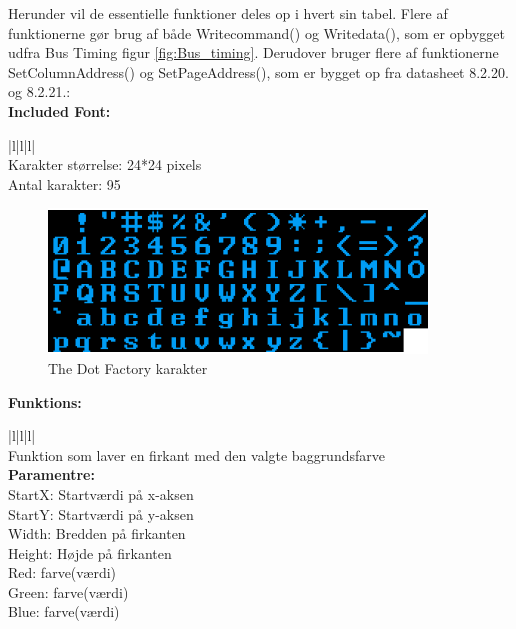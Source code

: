 Herunder vil de essentielle funktioner deles op i hvert sin tabel. Flere af funktionerne gør brug af både Writecommand() og Writedata(), som er opbygget udfra Bus Timing figur \ref{fig:Bus_timing}. Derudover bruger flere af funktionerne SetColumnAddress() og SetPageAddress(), som er bygget op fra datasheet 8.2.20. og 8.2.21.: \\

\newpage
\textbf{\Large Included Font:}

\begin{center}
\begin{tabular}{ |l|l|l| }
\hline
{} \\
\hline
Karakter størrelse: 24*24 pixels  \\
Antal karakter: 95\\
\hline

\end{tabular}
\end{center} 
\begin{figure}[H]
	\centering
	\includegraphics[width = 150 pt]{Img/Thedotfactory.png}
	\caption{The Dot Factory karakter}
	\label{fig:Thedotfactory}
\end{figure}

\textbf{\Large Funktions:}

\begin{center}
\begin{tabular}{ |l|l|l| }
\hline
{} \\
\hline
Funktion som laver en firkant med den valgte baggrundsfarve  \\
\hline
\textbf{Paramentre:}  \\ StartX: Startværdi på x-aksen \\StartY: Startværdi på y-aksen\\ Width: Bredden på firkanten\\ Height: Højde på firkanten\\ Red: farve(værdi)\\ Green: farve(værdi) \\ Blue: farve(værdi)\\
\hline
\end{tabular}
\end{center} 



